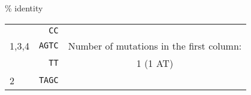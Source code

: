 \% identity
\begin{table}[H]
\centering
\begin{tabular}{|l|l|c}
\cline{1-2}
      & \verb|  CC|   &                          \\
1,3,4 & \verb|AGTC| & Number of mutations in the first column:  \\
      & \verb|  TT|   &  1 (1 AT) \\ \cline{1-2}
2     & \verb|TAGC| &                          \\ \cline{1-2}
\end{tabular}
\end{table}

\bigskip 

%
